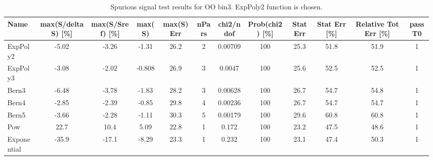 \begin{landscape}
\begin{table}[]
\footnotesize
\begin{tabular}{l|ccccccccccc}
Name        & max(S/deltaS) {[}\%{]} & max(S/Sref) {[}\%{]} & max(S) & max(S) Err & nPars & chi2/ndof & Prob(chi2) {[}\%{]} & Stat Err & Stat Err {[}\%{]} & Relative Tot Err {[}\%{]} & passT0 \\ \hline
ExpPoly2    & -5.02                  & -3.26                & -1.31  & 26.2       & 2     & 0.00709   & 100                 & 25.3     & 51.8              & 51.9                      & 1      \\
ExpPoly3    & -3.08                  & -2.02                & -0.808 & 26.9       & 3     & 0.0047    & 100                 & 25.6     & 52.5              & 52.5                      & 1      \\
Bern3       & -6.48                  & -3.78                & -1.83  & 28.2       & 3     & 0.00628   & 100                 & 26.7     & 54.7              & 54.8                      & 1      \\
Bern4       & -2.85                  & -2.39                & -0.85  & 29.8       & 4     & 0.00236   & 100                 & 26.7     & 54.7              & 54.7                      & 1      \\
Bern5       & -3.66                  & -2.28                & -1.11  & 30.3       & 5     & 0.00179   & 100                 & 29.6     & 60.8              & 60.8                      & 1      \\
Pow         & 22.7                   & 10.4                 & 5.09   & 22.8       & 1     & 0.172     & 100                 & 23.2     & 47.5              & 48.6                      & 1      \\
Exponential & -35.9                  & -17.1                & -8.29  & 23.3       & 1     & 0.232     & 100                 & 23.1     & 47.4              & 50.3                      & 1     \\
\end{tabular}
\caption{Spurious signal test results for OO bin3. ExpPoly2 function is chosen.}
\label{tab:SSbin3}
\end{table}
\end{landscape}
\clearpage

